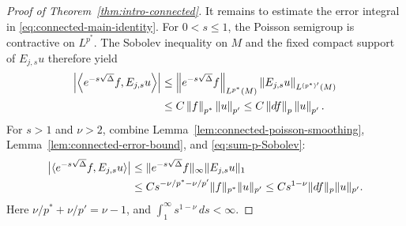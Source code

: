 \documentclass[12pt]{amsart}
\newcommand{\ip}[2]{\left\langle #1,#2\right\rangle}
\newcommand{\norm}[2]{\left\lVert #1\right\rVert_{#2}}
\newcommand{\abs}[1]{\left\lvert #1\right\rvert}
\theoremstyle{remark}
\begin{document}
\begin{proof}[Proof of Theorem~\ref{thm:intro-connected}]
It remains to estimate the error integral in
\eqref{eq:connected-main-identity}.  For $0<s\leq1$, the Poisson semigroup
is contractive on $L^{p^*}$.  The Sobolev inequality on $M$ and the fixed
compact support of $E_{j,s}u$ therefore yield
\begin{align}
 \abs{\ip{e^{-s\sqrt\Delta}f}{E_{j,s}u}}
 &\leq
 \norm{e^{-s\sqrt\Delta}f}{L^{p^*}(M)}
 \norm{E_{j,s}u}{L^{(p^*)'}(M)}\notag\\
 &\leq C\norm f{p^*}\norm u{p'}
 \leq C\norm{df}p\norm u{p'}.
 \label{eq:connected-small-error}
\end{align}
For $s>1$ and $\nu>2$, combine
Lemma~\ref{lem:connected-poisson-smoothing},
Lemma~\ref{lem:connected-error-bound}, and
\eqref{eq:sum-p-Sobolev}:
\begin{align}
 \bigl|\langle e^{-s\sqrt\Delta}f,E_{j,s}u\rangle\bigr|
 &\leq
 \|e^{-s\sqrt\Delta}f\|_\infty\|E_{j,s}u\|_1
 \notag\\
 &\leq
 Cs^{-\nu/p^*-\nu/p'}\|f\|_{p^*}\|u\|_{p'}
 \leq Cs^{1-\nu}\|df\|_p\|u\|_{p'}.
 \label{eq:connected-large-error}
\end{align}
Here $\nu/p^*+\nu/p'=\nu-1$, and
$\int_1^\infty s^{1-\nu}\,ds<\infty$.


\end{proof}
\end{document}
